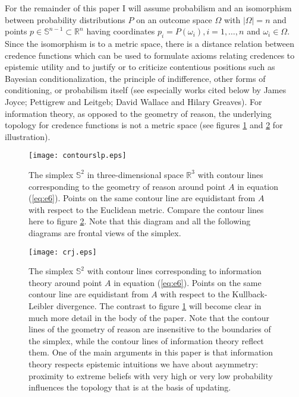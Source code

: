 \documentclass[11pt]{article}
\begin{document}
For the remainder of this paper I will assume probabilism and an
isomorphism between probability distributions $P$ on an outcome space
$\Omega$ with $|\Omega|=n$ and points
$p\in\mathbb{S}^{n-1}\subset\mathbb{R}^{n}$ having coordinates
$p_{i}=P(\omega_{i}),i=1,\ldots,n$ and $\omega_{i}\in{}\Omega$. Since
the isomorphism is to a metric space, there is a distance relation
between credence functions which can be used to formulate axioms
relating credences to epistemic utility and to justify or to criticize
contentious positions such as Bayesian conditionalization, the
principle of indifference, other forms of conditioning, or probabilism
itself (see especially works cited below by James Joyce; Pettigrew and
Leitgeb; David Wallace and Hilary Greaves). For information theory, as
opposed to the geometry of reason, the underlying topology for
credence functions is not a metric space (see figures
\ref{fig:contourslp} and \ref{fig:contoursrj} for illustration).

\begin{figure}[ht]
  \begin{flushright}
    \begin{minipage}[h]{.7\linewidth}
      \texttt{[image: contourslp.eps]}
      \caption{\footnotesize The simplex $\mathbb{S}^{2}$ in
        three-dimensional space $\mathbb{R}^{3}$ with contour lines
        corresponding to the geometry of reason around point $A$ in
        equation (\ref{eq:e6}). Points on the same contour line are
        equidistant from $A$ with respect to the Euclidean metric.
        Compare the contour lines here to figure
        \ref{fig:contoursrj}. Note that this diagram and all the
        following diagrams are frontal views of the simplex.}
      \label{fig:contourslp}
    \end{minipage}
  \end{flushright}
\end{figure}

\begin{figure}[ht]
  \begin{flushright}
    \begin{minipage}[h]{.7\linewidth}
      \texttt{[image: crj.eps]}
      \caption{\footnotesize The simplex $\mathbb{S}^{2}$ with contour
        lines corresponding to information theory around point $A$ in
        equation (\ref{eq:e6}). Points on the same contour line are
        equidistant from $A$ with respect to the Kullback-Leibler
        divergence. The contrast to figure \ref{fig:contourslp} will
        become clear in much more detail in the body of the paper.
        Note that the contour lines of the geometry of reason are
        insensitive to the boundaries of the simplex, while the
        contour lines of information theory reflect them. One of the
        main arguments in this paper is that information theory
        respects epistemic intuitions we have about asymmetry:
        proximity to extreme beliefs with very high or very low
        probability influences the topology that is at the basis of
        updating.}
      \label{fig:contoursrj}
    \end{minipage}
  \end{flushright}
\end{figure}
\end{document}
